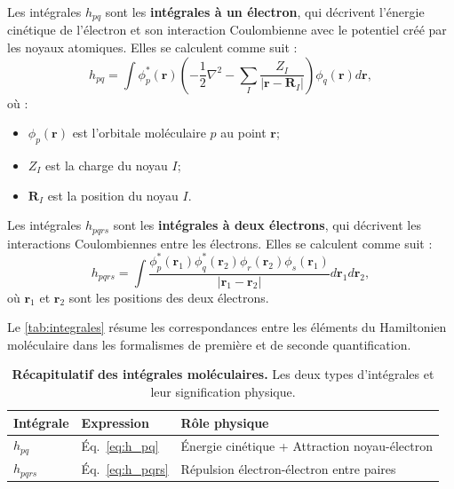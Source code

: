 \documentclass[12pt,a4paper,svgnames,x11names,rgb,table]{article} %
\numberwithin{equation}{section} %
\numberwithin{figure}{section} %
\numberwithin{table}{section} %
\begin{document}
Les intégrales $h_{pq}$ sont les \textbf{intégrales à un électron}, qui décrivent l'énergie cinétique de l'électron et son interaction Coulombienne avec le potentiel créé par les noyaux atomiques. Elles se calculent comme suit :
\begin{equation}\label{eq:h_pq}
h_{pq} = \int \phi^*_p(\mathbf{r}) \left( -\frac12 \nabla^2 - \sum_{I} \frac{Z_I}{|\mathbf{r}-\mathbf{R}_I|} \right)   \phi_q(\mathbf{r})d\mathbf{r},
\end{equation}
où :
\begin{itemize}
    \item $\phi_p(\mathbf{r})$ est l'orbitale moléculaire $p$ au point $\mathbf{r}$;
    \item $Z_I$ est la charge du noyau $I$;
    \item $\mathbf{R}_I$ est la position du noyau $I$.
\end{itemize}

Les intégrales $h_{pqrs}$ sont les \textbf{intégrales à deux électrons}, qui décrivent les interactions Coulombiennes entre les électrons. Elles se calculent comme suit :
\begin{equation}\label{eq:h_pqrs}
h_{pqrs} = \int \frac{\phi^*_p(\mathbf{r}_1)  \phi^*_q(\mathbf{r}_2) \phi_r(\mathbf{r}_2)  \phi_s(\mathbf{r}_1)}
{|\mathbf{r}_1-\mathbf{r}_2|}d\mathbf{r}_1d\mathbf{r}_2,
\end{equation}
où $\mathbf{r}_1$ et $\mathbf{r}_2$ sont les positions des deux électrons. 

Le \autoref{tab:integrales} résume les correspondances entre les éléments du Hamiltonien moléculaire dans les formalismes de première et de seconde quantification.

\begin{table}[h]
    \centering
    \begin{tabular}{|l|l|l|}
    \toprule
    \textbf{Intégrale} & \textbf{Expression} & \textbf{Rôle physique} \\ \midrule
    $h_{pq}$ & Éq.~\eqref{eq:h_pq} & Énergie cinétique + Attraction noyau-électron \\ \hline
    $h_{pqrs}$ & Éq.~\eqref{eq:h_pqrs} & Répulsion électron-électron entre paires \\ \bottomrule
    \end{tabular}
    \caption{\textbf{Récapitulatif des intégrales moléculaires.} Les deux types d'intégrales et leur signification physique.}
    \label{tab:integrales}
\end{table}
\end{document}
